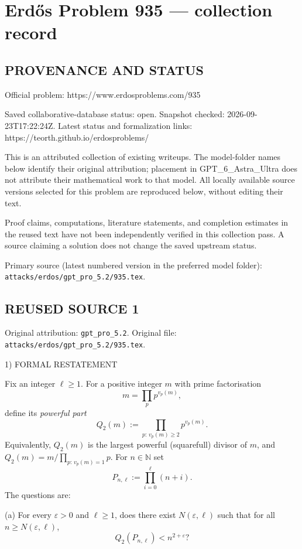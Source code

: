 \section*{Erd\H{o}s Problem 935 --- collection record}

\subsection*{PROVENANCE AND STATUS}
Official problem: https://www.erdosproblems.com/935

Saved collaborative-database status: open.
Snapshot checked: 2026-09-23T17:22:24Z.
Latest status and formalization links: https://teorth.github.io/erdosproblems/

This is an attributed collection of existing writeups. The model-folder names below identify their original attribution; placement in GPT\_6\_Astra\_Ultra does not attribute their mathematical work to that model. All locally available source versions selected for this problem are reproduced below, without editing their text.

Proof claims, computations, literature statements, and completion estimates in the reused text have not been independently verified in this collection pass. A source claiming a solution does not change the saved upstream status.

Primary source (latest numbered version in the preferred model folder): \texttt{attacks/erdos/gpt\_pro\_5.2/935.tex}.

\subsection*{REUSED SOURCE 1}
Original attribution: \texttt{gpt\_pro\_5.2}.
Original file: \texttt{attacks/erdos/gpt\_pro\_5.2/935.tex}.


1) FORMAL RESTATEMENT

Fix an integer \(\ell\ge 1\). For a positive integer \(m\) with prime factorisation
\[m=\prod_{p} p^{v_p(m)},\]
define its \emph{powerful part}
\[Q_2(m):=\prod_{p:\,v_p(m)\ge 2} p^{v_p(m)}.\]
Equivalently, \(Q_2(m)\) is the largest powerful (squarefull) divisor of \(m\), and
\(Q_2(m)=m/\prod_{p:\,v_p(m)=1}p\).
For \(n\in\mathbb N\) set
\[P_{n,\ell}:=\prod_{i=0}^{\ell} (n+i).\]
The questions are:

(a) For every \(\varepsilon>0\) and \(\ell\ge 1\), does there exist \(N(\varepsilon,\ell)\) such that for all \(n\ge N(\varepsilon,\ell)\),
\[Q_2(P_{n,\ell})<n^{2+\varepsilon}?\]

